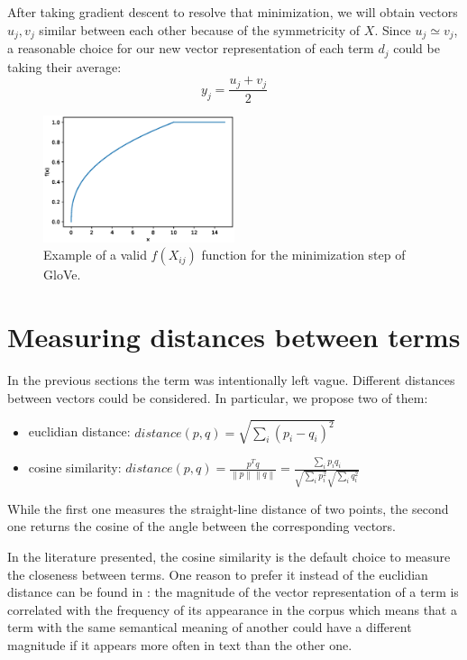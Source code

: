 After taking gradient descent to resolve that minimization, we will obtain vectors
$u_j, v_j$ similar between each other because of the symmetricity of $X$.
Since $u_j \simeq v_j$, a reasonable choice for our new vector representation of
each term $d_j$ could be taking their average:
$$y_j = \frac{u_j + v_j}{2}$$

\begin{figure}[h]
    \centering
    \includegraphics[width=0.5\textwidth]{images/glovef}
    \caption{Example of a valid $f(X_{ij})$ function for the minimization step of GloVe.}
    \label{fig:glovef}
\end{figure}

\section{Measuring distances between terms}
In the previous sections the term  was intentionally left vague.
Different distances between vectors could be considered.
In particular, we propose two of them:
\begin{itemize}
    \item euclidian distance: $distance(p, q) = \sqrt{\sum_i (p_i - q_i)^2}$
    \item cosine similarity: $distance(p, q) = \frac{p^T q}{\left\lVert p \right\rVert \left\lVert q \right\rVert} = \frac{\sum_i p_i q_i}{\sqrt{\sum_i p_i^2} \sqrt{\sum_i q_i^2}}$
\end{itemize}

While the first one measures the straight-line distance of two points, the second one returns the cosine of the angle between the corresponding vectors.

In the literature presented, the cosine similarity is the default choice to measure the closeness between terms.
One reason to prefer it instead of the euclidian distance
can be found in \cite{DBLP:journals/corr/SchakelW15}: the magnitude of the vector representation of a term
is correlated with the frequency of its appearance in the corpus which means that
a term with the same semantical meaning of another could have a different
magnitude if it appears more often in text than the other one.